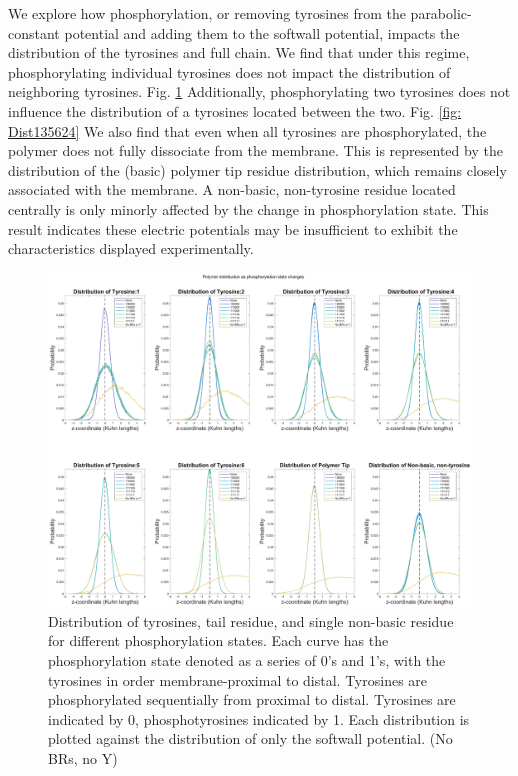 \documentclass[../../AdvancementSummary.tex]{subfiles}
\begin{document}
We explore how phosphorylation, or removing tyrosines from the parabolic-constant potential and adding them to the softwall potential, impacts the distribution of the tyrosines and full chain. We find that under this regime, phosphorylating individual tyrosines does not impact the distribution of neighboring tyrosines. Fig. \ref{fig: Dist123456} Additionally, phosphorylating two tyrosines does not influence the distribution of a tyrosines located between the two. Fig. \ref{fig: Dist135624} We also find that even when all tyrosines are phosphorylated, the polymer does not fully dissociate from the membrane. This is represented by the distribution of the (basic) polymer tip residue distribution, which remains closely associated with the membrane. A non-basic, non-tyrosine residue located centrally is only minorly affected by the change in phosphorylation state. This result indicates these electric potentials may be insufficient to exhibit the characteristics displayed experimentally.

\begin{figure}[H]
\begin{center}
\includegraphics[width=\linewidth]{ResultsFigures/CD3ZetaSoftwallPiecewiseBasicsY/Phosphorylation/iSiteDistribution123456.eps}
\end{center}
\caption{Distribution of tyrosines, tail residue, and single non-basic residue for different phosphorylation states. Each curve has the phosphorylation state denoted as a series of 0's and 1's, with the tyrosines in order membrane-proximal to distal. Tyrosines are phosphorylated sequentially from proximal to distal. Tyrosines are indicated by 0, phosphotyrosines indicated by 1. Each distribution is plotted against the distribution of only the softwall potential. (No BRs, no Y) \label{fig: Dist123456}}
\end{figure}
\end{document}
